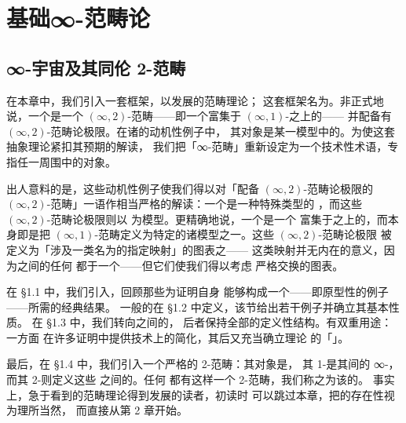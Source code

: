 \part{基础∞-范畴论}
\chapter{∞-宇宙及其同伦 2-范畴}\label{ch:infinity-cosmoi}

在本章中，我们引入一套框架，以发展\trInfinityCategory{}的\trFormal{}范畴理论；
这套框架名为\emph{\trInfinityCosmos}。非正式地说，一个\trInfinityCosmos{}是一个
$(\infty,2)$-范畴——即一个富集于 $(\infty,1)$-\trCategory{}之上的\trCategory{}——
并配备有 $(\infty,2)$-范畴论极限。在诸\trInfinityCosmos{}的动机性例子中，
其对象是某一模型中的\trInfinityCategory。为使这套抽象理论紧扣其预期的解读，
我们把「∞-范畴」重新设定为一个技术性术语，专指任一周围\trInfinityCosmos{}中的对象。

出人意料的是，这些动机性例子使我们得以对「配备 $(\infty,2)$-范畴论极限的
$(\infty,2)$-范畴」一语作相当严格的解读：一个\trInfinityCosmos{}是一种特殊类型的%
\trSimpliciallyEnrichedCategory{}，而这些 $(\infty,2)$-范畴论极限则以%
\trSimpliciallyEnrichedLimit{}为模型。更精确地说，一个\trInfinityCosmos{}是一个
富集于\trQuasiCategory{}之上的\trCategory{}，而\trQuasiCategory{}本身即是把
$(\infty,1)$-范畴定义为特定\trSimplicialSet{}的诸模型之一。这些 $(\infty,2)$-范畴论极限
被定义为「涉及一类名为\emph{\trIsofibration}的指定映射」的图表之\trLimit{}——
这类映射并无内在的\trHomotopy{}意义，因为\trInfinityCategory{}之间的任何%
\trFunctor{}都\trEquivalence{}于一个\trIsofibration{}——但它们使我们得以考虑
严格交换的图表。

在 §1.1 中，我们引入\trQuasiCategory{}，回顾那些为证明\trQuasiCategory{}自身
能够构成一个\trInfinityCosmos{}——即原型性的例子——所需的经典结果。
一般的\trInfinityCosmos{}在 §1.2 中定义，该节给出若干例子并确立其基本性质。
在 §1.3 中，我们转向\trInfinityCosmos{}之间的\emph{\trCosmologicalFunctor}，
后者保持全部的定义性结构。\trCosmologicalFunctor{}有双重用途：一方面
在许多证明中提供技术上的简化，其后又充当确立\trInfinityCategory{}理论%
\trModelIndependence{}的「\trChangeOfModel{}」\trFunctor。

最后，在 §1.4 中，我们引入一个严格的 2-范畴：其对象是\trInfinityCategory{}，
其 1-\trCell{}是其间的 ∞-\trFunctor{}，而其 2-\trCell{}则定义这些%
\trFunctor{}之间的\trInfinityNaturalTransformation。任何\trInfinityCosmos{}%
都有这样一个 2-范畴，我们称之为该\trInfinityCosmos{}的\trHomotopyTwoCategory。
事实上，急于看到\trInfinityCategory{}的范畴理论得到发展的读者，初读时
可以跳过本章，把\trHomotopyTwoCategory{}的存在性视为理所当然，
而直接从第 2 章开始。


